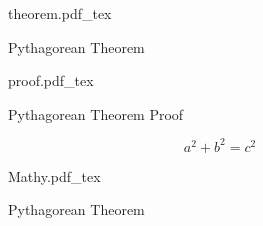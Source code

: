 \documentclass[17pt]{article}
\newcommand{\incfig}[1]{%
    \def\svgwidth{\columnwidth}
    {#1.pdf_tex}
}
\begin{document}

\begin{figure}[ht]
    \centering
    \incfig{theorem}
    \caption{Pythagorean Theorem}
    \label{fig:pythagorean-theorem}
\end{figure}

\newpage

\begin{figure}[ht]
    \centering
    \incfig{proof}
    \caption{Pythagorean Theorem Proof}
    \label{fig:pythagorean-theorem-proof}
\end{figure}

\newpage

\[
a^2 + b^2 = c^2
\]


\begin{figure}[ht]
    \centering
    \incfig{Mathy}
    \caption{Pythagorean Theorem}
    \label{fig:pythagorean-theorem-proof}
\end{figure}

\Large
\end{document}

